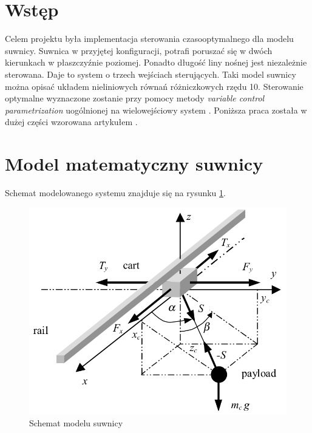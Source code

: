 \documentclass[12pt]{article}
\begin{document}
 
 

\section{Wstęp}

Celem projektu była implementacja sterowania czasooptymalnego dla modelu
suwnicy. Suwnica w przyjętej konfiguracji, potrafi poruszać się w dwóch
kierunkach w płaszczyźnie poziomej. Ponadto długość liny nośnej jest niezależnie sterowana.
Daje to system o trzech wejściach sterujących. Taki model suwnicy można opisać
układem nieliniowych równań różniczkowych rzędu 10. Sterowanie optymalne
wyznaczone zostanie przy pomocy metody \textit{variable control
parametrization} uogólnionej na wielowejściowy system \cite{agh:vcpftop}.
Poniższa praca została w dużej części wzorowana artykułem \cite{agh:crane}.

\newpage

\section{Model matematyczny suwnicy}

Schemat modelowanego systemu znajduje się na rysunku \ref{sch:model}.

\begin{figure}[!htb]
  \begin{center}
    \includegraphics[width=14cm]
    {../res/img/sch-model.png}
  \end{center}
  \caption{Schemat modelu suwnicy}
  \label{sch:model}
\end{figure}
\end{document}
